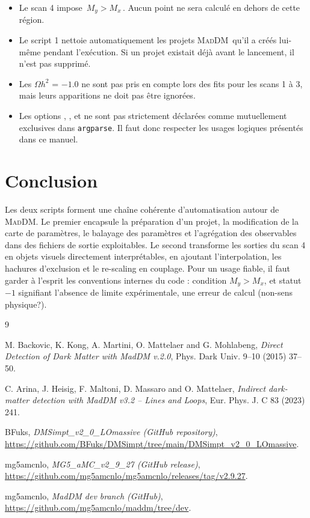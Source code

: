 \documentclass[11pt,a4paper]{article}
\newcommand{\opt}[1]{\texttt{\detokenize{#1}}}
\newcommand{\mad}{\textsc{MadDM}}
\begin{document}
\begin{itemize}[leftmargin=1.4em]
\item Le scan 4 impose \(\,M_y > M_x\,\). Aucun point ne sera calculé en dehors de cette région.
\item Le script 1 nettoie automatiquement les projets \mad\ qu'il a créés lui-même pendant l'exécution. Si un projet existait déjà avant le lancement, il n'est pas supprimé.
\item Les \(\Omega h^2\) = \(-1.0\) ne sont pas pris en compte lors des fits pour les scans 1 à 3, mais leurs apparitions ne doit pas être ignorées.
\item Les options \opt{--all}, \opt{--all2}, \opt{--lambdas} et \opt{--iso_omega} ne sont pas strictement déclarées comme mutuellement exclusives dans \texttt{argparse}. Il faut donc respecter les usages logiques présentés dans ce manuel.
\end{itemize}

\section{Conclusion}

Les deux scripts forment une chaîne cohérente d'automatisation autour de \mad. Le premier encapsule la préparation d'un projet, la modification de la carte de paramètres, le balayage des paramètres et l'agrégation des observables dans des fichiers de sortie exploitables. Le second transforme les sorties du scan 4 en objets visuels directement interprétables, en ajoutant l'interpolation, les hachures d'exclusion et le re-scaling en couplage. Pour un usage fiable, il faut garder à l'esprit les conventions internes du code : condition \(M_y>M_x\), et statut \(-1\) signifiant l'absence de limite expérimentale, une erreur de calcul (non-sens physique?).

\begin{thebibliography}{9}

M. Backovic, K. Kong, A. Martini, O. Mattelaer and G. Mohlabeng,
\emph{Direct Detection of Dark Matter with MadDM v.2.0},
Phys. Dark Univ. 9--10 (2015) 37--50.

C. Arina, J. Heisig, F. Maltoni, D. Massaro and O. Mattelaer,
\emph{Indirect dark-matter detection with MadDM v3.2 -- Lines and Loops},
Eur. Phys. J. C 83 (2023) 241.

BFuks,
\emph{DMSimpt\_v2\_0\_LOmassive (GitHub repository)},
\url{https://github.com/BFuks/DMSimpt/tree/main/DMSimpt_v2_0_LOmassive}.

mg5amcnlo,
\emph{MG5\_aMC\_v2\_9\_27 (GitHub release)},
\url{https://github.com/mg5amcnlo/mg5amcnlo/releases/tag/v2.9.27}.

mg5amcnlo,
\emph{MadDM dev branch (GitHub)},
\url{https://github.com/mg5amcnlo/maddm/tree/dev}.

\end{thebibliography}
\end{document}
